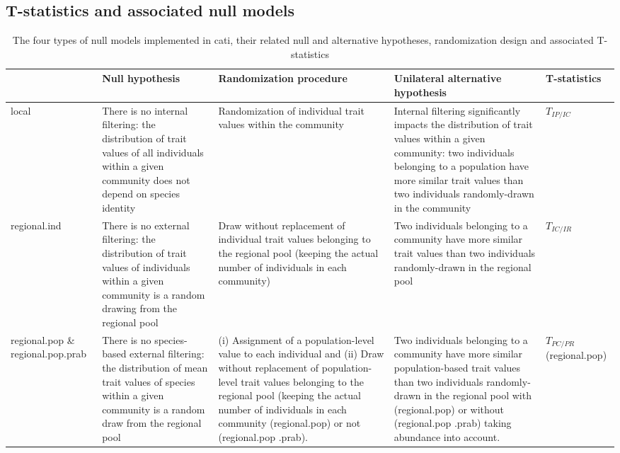 \documentclass[12pt]{article}\usepackage[]{graphicx}\usepackage[]{color}
\begin{document}
\begin{landscape}
\subsection {T-statistics and associated null models}
  
\begin{table}[h]
\caption[T-statistics and associated null models]{The four types of null models implemented in cati, their related null and alternative hypotheses, randomization design and associated T-statistics}
\begin{tabular}{m{2.7cm} m{5.3cm} m{6.3cm} m{6.2cm} m{2.5cm}}

& Null hypothesis & Randomization procedure & Unilateral alternative hypothesis & T-statistics  \tabularnewline
\hline \hline \hline

local & There is no internal filtering: the distribution of trait values of all individuals within a given community does not depend on species identity & Randomization of individual trait values within the community& Internal filtering significantly impacts the distribution of trait values within a given community: two individuals belonging to a population have more similar trait values than two individuals randomly-drawn in the community & $T_{IP/IC}$   \tabularnewline

\hline

regional.ind  & There is no external filtering: the distribution of trait values of individuals within a given community is a random drawing from the regional pool & Draw without replacement of individual trait values belonging to the regional pool (keeping the actual number of individuals in each community) & Two individuals belonging to a community have more similar trait values than two individuals randomly-drawn in the regional pool & $T_{IC/IR}$\tabularnewline

\hline

regional.pop \& regional.pop.prab & There is no species-based external filtering: the distribution of mean trait values of species within a given community is a random draw from the regional pool & (i) Assignment of a population-level value to each individual and (ii) Draw without replacement of population-level trait values belonging to the regional pool (keeping the actual number of individuals in each community (regional.pop) or not (regional.pop .prab). & Two individuals belonging to a community have more similar population-based trait values than two individuals randomly-drawn in the regional pool with (regional.pop) or without (regional.pop .prab) taking abundance into account. & $T_{PC/PR}$  (regional.pop) \tabularnewline


\end{tabular}
\end{table}
\end{landscape}
\end{document}
